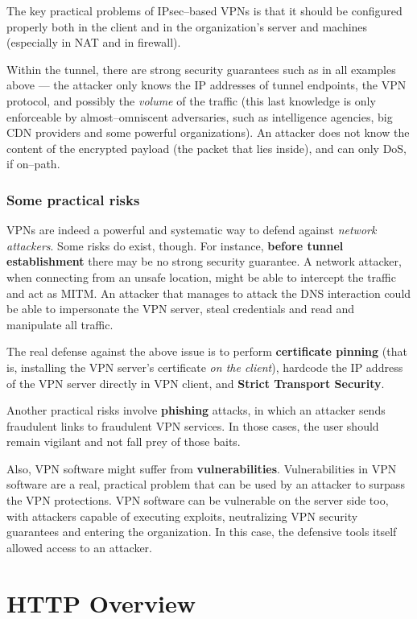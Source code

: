 \documentclass[10pt]{\classname}
\begin{document}
The key practical problems of IPsec--based VPNs is that it should be configured
properly both in the client and in the organization's server and machines
(especially in NAT and in firewall).

Within the tunnel, there are strong security guarantees such as in all examples
above --- the attacker only knows the IP addresses of tunnel endpoints, the VPN
protocol, and possibly the \emph{volume} of the traffic (this last knowledge is
only enforceable by almost--omniscent adversaries, such as intelligence
agencies, big CDN providers and some powerful organizations). An attacker does
not know the content of the encrypted payload (the packet that lies inside),
and can only DoS, if on--path.

\subsection{Some practical risks}

VPNs are indeed a powerful and systematic way to defend against \emph{network
attackers}. Some risks do exist, though. For instance, \textbf{before tunnel
establishment} there may be no strong security guarantee. A network attacker,
when connecting from an unsafe location, might be able to intercept the traffic
and act as MITM. An attacker that manages to attack the DNS interaction could
be able to impersonate the VPN server, steal credentials and read and
manipulate all traffic.

The real defense against the above issue is to perform \textbf{certificate
pinning} (that is, installing the VPN server's certificate \emph{on the
client}), hardcode the IP address of the VPN server directly in VPN client, and
\textbf{Strict Transport Security}.

Another practical risks involve \textbf{phishing} attacks, in which an attacker
sends fraudulent links to fraudulent VPN services. In those cases, the user
should remain vigilant and not fall prey of those baits.

Also, VPN software might suffer from \textbf{vulnerabilities}. Vulnerabilities
in VPN software are a real, practical problem that can be used by an attacker
to surpass the VPN protections. VPN software can be vulnerable on the server
side too, with attackers capable of executing exploits, neutralizing VPN
security guarantees and entering the organization. In this case, the defensive
tools itself allowed access to an attacker.

\chapter{HTTP Overview}
\end{document}
